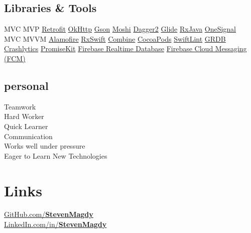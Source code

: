 \documentclass[]{Resume}
\begin{document}
\begin{minipage}[t]{0.33\textwidth}
\subsection{Libraries \& Tools}
MVC \textbullet{}
MVP \textbullet{}
\href{https://github.com/square/retrofit}{Retrofit} \textbullet{}
\href{https://github.com/square/okhttp}{OkHttp} \textbullet{}
\href{https://github.com/google/gson}{Gson} \textbullet{}
\href{https://github.com/square/moshi}{Moshi} \textbullet{}
\href{https://github.com/google/dagger}{Dagger2} \textbullet{}
\href{https://github.com/bumptech/glide}{Glide} \textbullet{}
\href{https://github.com/ReactiveX/RxJava}{RxJava} \textbullet{}
\href{https://onesignal.com/}{OneSignal}\\
\vspace{\topsep}
MVC \textbullet{} 
MVVM \textbullet{}
\href{https://github.com/Alamofire/Alamofire}{Alamofire} \textbullet{}
\href{https://github.com/ReactiveX/RxSwift}{RxSwift} \textbullet{}
\href{https://developer.apple.com/documentation/combine}{Combine} \textbullet{}
\href{https://cocoapods.org/}{CocoaPods} \textbullet{}
\href{https://github.com/realm/SwiftLint}{SwiftLint} \textbullet{}
\href{https://github.com/groue/GRDB.swift}{GRDB} \textbullet{}
\href{https://firebase.google.com/products/crashlytics}{Crashlytics} \textbullet{}
\href{https://github.com/mxcl/PromiseKit}{PromiseKit} \textbullet{}
\href{https://firebase.google.com/products/realtime-database}{Firebase Realtime Database} \textbullet{}
\href{https://firebase.google.com/products/cloud-messaging}{Firebase Cloud Messaging (FCM)}
\sectionsep

\subsection{personal}
Teamwork\\
Hard Worker\\
Quick Learner\\
Communication\\
Works well under pressure\\
Eager to Learn New Technologies
\sectionsep


\section{Links} 
\href{https://github.com/stevenmagdy}{GitHub.com/\bf StevenMagdy}\\
\href{https://www.linkedin.com/in/StevenMagdy/}{LinkedIn.com/in/\bf StevenMagdy}

%
%

\end{minipage} 
\end{document}
